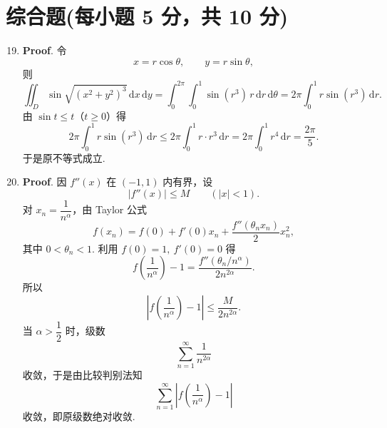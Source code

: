 \documentclass[../Main.tex]{subfiles}
\begin{document}
\section{综合题(每小题 5 分，共 10 分)}
\begin{enumerate}
    \setcounter{enumi}{18}
    \item \textbf{Proof}. 令
          \[
              x=r\cos\theta,\qquad y=r\sin\theta,
          \]
          则
          \[
              \iint_D \sin \sqrt{(x^2+y^2)^3}\,\mathrm{d}x\,\mathrm{d}y
              =\int_0^{2\pi}\int_0^1 \sin(r^3)\,r\,\mathrm{d}r\,\mathrm{d}\theta
              =2\pi\int_0^1 r\sin(r^3)\,\mathrm{d}r.
          \]
          由 \(\sin t\le t\)（\(t\ge 0\)）得
          \[
              2\pi\int_0^1 r\sin(r^3)\,\mathrm{d}r
              \le 2\pi\int_0^1 r\cdot r^3\,\mathrm{d}r
              =2\pi\int_0^1 r^4\,\mathrm{d}r
              =\frac{2\pi}{5}.
          \]
          于是原不等式成立.

    \item \textbf{Proof}. 因 \(f''(x)\) 在 \((-1,1)\) 内有界，设
          \[
              |f''(x)|\le M\qquad (|x|<1).
          \]
          对 \(x_n=\dfrac{1}{n^\alpha}\)，由 Taylor 公式
          \[
              f(x_n)=f(0)+f'(0)x_n+\frac{f''(\theta_n x_n)}{2}x_n^2,
          \]
          其中 \(0<\theta_n<1\). 利用 \(f(0)=1,\ f'(0)=0\) 得
          \[
              f\left(\frac{1}{n^\alpha}\right)-1
              =\frac{f''(\theta_n/n^\alpha)}{2n^{2\alpha}}.
          \]
          所以
          \[
              \left|f\left(\frac{1}{n^\alpha}\right)-1\right|
              \le \frac{M}{2n^{2\alpha}}.
          \]
          当 \(\alpha>\dfrac12\) 时，级数
          \[
              \sum_{n=1}^{\infty}\frac{1}{n^{2\alpha}}
          \]
          收敛，于是由比较判别法知
          \[
              \sum_{n=1}^{\infty}\left|f\left(\frac{1}{n^\alpha}\right)-1\right|
          \]
          收敛，即原级数绝对收敛.
\end{enumerate}
\end{document}
